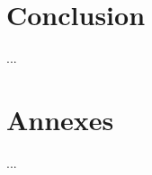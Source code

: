 \documentclass[french,oneside]{article}
\begin{document}
\cleardoublepage
\newpage


\section{Conclusion}

...

























\appendix \newpage

























\section{Annexes}

...















\newpage \listoffigures %
\newpage
\begin{thebibliography}{9}
\end{thebibliography}
\end{document}

